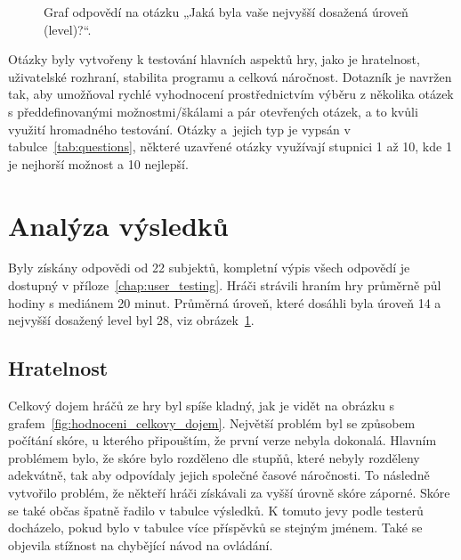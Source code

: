 \begin{figure}[ht]
    \centering
    \caption{Graf odpovědí na otázku „Jaká byla vaše nejvyšší dosažená úroveň (level)?“.}
    \label{fig:nejvyssi_uroven}
\end{figure}

Otázky byly vytvořeny k testování hlavních aspektů hry, jako je hratelnost, uživatelské rozhraní, stabilita programu a celková náročnost. Dotazník je navržen tak, aby umožňoval rychlé vyhodnocení prostřednictvím výběru z několika otázek s předdefinovanými možnostmi/škálami a pár otevřených otázek, a to kvůli využití hromadného testování. Otázky a~jejich typ je vypsán v tabulce~\ref{tab:questions}, některé uzavřené otázky využívají stupnici 1 až 10, kde 1 je nejhorší možnost a 10 nejlepší.

\section{Analýza výsledků} \label{chap:Analýza výsledků}
Byly získány odpovědi od 22 subjektů, kompletní výpis všech odpovědí je dostupný v příloze~\ref{chap:user_testing}. Hráči strávili hraním hry průměrně půl hodiny s mediánem 20 minut. Průměrná úroveň, které dosáhli byla úroveň 14 a nejvyšší dosažený level byl 28, viz obrázek~\ref{fig:nejvyssi_uroven}.

\subsection*{Hratelnost}
Celkový dojem hráčů ze hry byl spíše kladný, jak je vidět na obrázku s grafem~\ref{fig:hodnoceni_celkovy_dojem}. Největší problém byl se způsobem počítání skóre, u kterého připouštím, že první verze nebyla dokonalá. Hlavním problémem bylo, že skóre bylo rozděleno dle stupňů, které nebyly rozděleny adekvátně, tak aby odpovídaly jejich společné časové náročnosti. To následně vytvořilo problém, že někteří hráči získávali za vyšší úrovně skóre záporné. Skóre se také občas špatně řadilo v tabulce výsledků. K tomuto jevy podle testerů docházelo, pokud bylo v tabulce více příspěvků se stejným jménem. Také se objevila stížnost na chybějící návod na ovládání.

